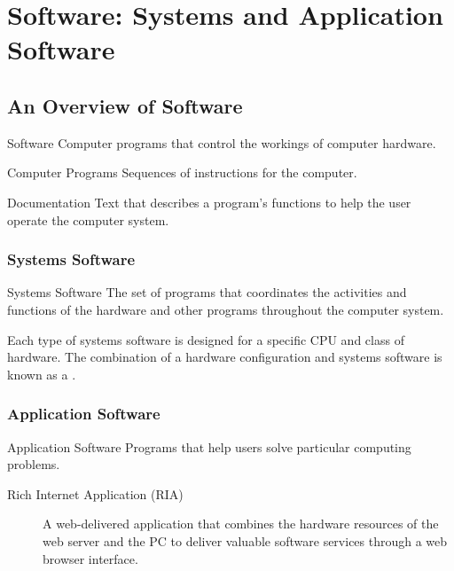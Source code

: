\documentclass[\main/notes.tex]{subfiles}
\begin{document}
	\setcounter{chapter}{3}
	\chapter[Software]{Software: Systems and Application Software}
		\section{An Overview of Software}
			\begin{definition}{Software}
				Computer programs that control the workings of computer hardware.
			\end{definition}
			\begin{definition}{Computer Programs}
				Sequences of instructions for the computer.
			\end{definition}
			\begin{definition}{Documentation}
				Text that describes a program's functions to help the user operate the computer system.
			\end{definition}
			\subsection{Systems Software}
				\begin{definition}{Systems Software}
					The set of programs that coordinates the activities and functions of the hardware and other programs throughout the computer system.

					Each type of systems software is designed for a specific CPU and class of hardware. The combination of a hardware configuration and systems software is known as a .
				\end{definition}
			\subsection{Application Software}
				\begin{definition}{Application Software}
					Programs that help users solve particular computing problems.
					\begin{description}
						\item[Rich Internet Application (RIA)] A web-delivered application that combines the hardware resources of the web server and the PC to deliver valuable software services through a web browser interface. 
					\end{description}
				\end{definition}
\end{document}
